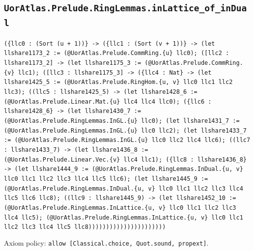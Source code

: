 \documentclass[11pt]{article}
\begin{document}
\subsection*{\texttt{UorAtlas.Prelude.RingLemmas.inLattice\_of\_inDual}}
\noindent\texttt{(\{llc0 : (Sort (u + 1))\} -> (\{llc1 : (Sort (v + 1))\} -> (let llshare1173\_2 := (@UorAtlas.Prelude.CommRing.\{u\} llc0); ([llc2 : llshare1173\_2] -> (let llshare1175\_3 := (@UorAtlas.Prelude.CommRing.\{v\} llc1); ([llc3 : llshare1175\_3] -> (\{llc4 : Nat\} -> (let llshare1425\_5 := (@UorAtlas.Prelude.RingHom.\{u, v\} llc0 llc1 llc2 llc3); ((llc5 : llshare1425\_5) -> (let llshare1428\_6 := (@UorAtlas.Prelude.Linear.Mat.\{u\} llc4 llc4 llc0); (\{llc6 : llshare1428\_6\} -> (let llshare1430\_7 := (@UorAtlas.Prelude.RingLemmas.InGL.\{u\} llc0); (let llshare1431\_7 := (@UorAtlas.Prelude.RingLemmas.InGL.\{u\} llc0 llc2); (let llshare1433\_7 := (@UorAtlas.Prelude.RingLemmas.InGL.\{u\} llc0 llc2 llc4 llc6); ((llc7 : llshare1433\_7) -> (let llshare1436\_8 := (@UorAtlas.Prelude.Linear.Vec.\{v\} llc4 llc1); (\{llc8 : llshare1436\_8\} -> (let llshare1444\_9 := (@UorAtlas.Prelude.RingLemmas.InDual.\{u, v\} llc0 llc1 llc2 llc3 llc4 llc5 llc6); (let llshare1445\_9 := (@UorAtlas.Prelude.RingLemmas.InDual.\{u, v\} llc0 llc1 llc2 llc3 llc4 llc5 llc6 llc8); ((llc9 : llshare1445\_9) -> (let llshare1452\_10 := (@UorAtlas.Prelude.RingLemmas.InLattice.\{u, v\} llc0 llc1 llc2 llc3 llc4 llc5); (@UorAtlas.Prelude.RingLemmas.InLattice.\{u, v\} llc0 llc1 llc2 llc3 llc4 llc5 llc8))))))))))))))))))))))}\par
\noindent Axiom policy: \texttt{allow [Classical.choice, Quot.sound, propext]}.\par
\end{document}
